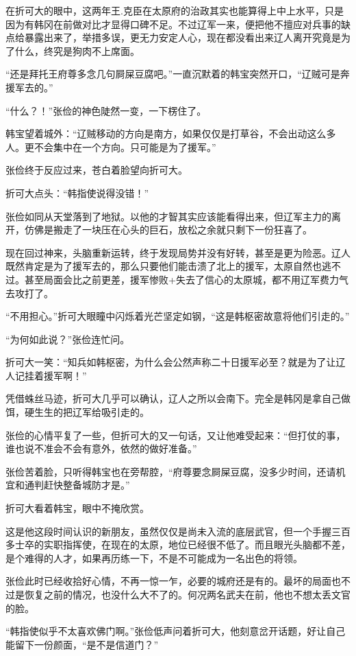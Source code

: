 在折可大的眼中，这两年王.克臣在太原府的治政其实也能算得上中上水平，只是因为有韩冈在前做对比才显得口碑不足。不过辽军一来，便把他不擅应对兵事的缺点给暴露出来了，举措多误，更无力安定人心，现在都没看出来辽人离开究竟是为了什么，终究是狗肉不上席面。

“还是拜托王府尊多念几句屙屎豆腐吧。”一直沉默着的韩宝突然开口，“辽贼可是奔援军去的。”

“什么？！”张俭的神色陡然一变，一下楞住了。

韩宝望着城外：“辽贼移动的方向是南方，如果仅仅是打草谷，不会出动这么多人。更不会集中在一个方向。只可能是为了援军。”

张俭终于反应过来，苍白着脸望向折可大。

折可大点头：“韩指使说得没错！”

张俭如同从天堂落到了地狱。以他的才智其实应该能看得出来，但辽军主力的离开，仿佛是搬走了一块压在心头的巨石，放松之余就只剩下一份狂喜了。

现在回过神来，头脑重新运转，终于发现局势并没有好转，甚至是更为险恶。辽人既然肯定是为了援军去的，那么只要他们能击溃了北上的援军，太原自然也逃不过。甚至局面会比之前更差，援军惨败+失去了信心的太原城，都不用辽军费力气去攻打了。

“不用担心。”折可大眼瞳中闪烁着光芒坚定如钢，“这是韩枢密故意将他们引走的。”

“为何如此说？”张俭连忙问。

折可大一笑：“知兵如韩枢密，为什么会公然声称二十日援军必至？就是为了让辽人记挂着援军啊！”

凭借蛛丝马迹，折可大几乎可以确认，辽人之所以会南下。完全是韩冈是拿自己做饵，硬生生的把辽军给吸引走的。

张俭的心情平复了一些，但折可大的又一句话，又让他难受起来：“但打仗的事，谁也说不准会不会有意外，依然的做好准备。”

张俭苦着脸，只听得韩宝也在旁帮腔，“府尊要念屙屎豆腐，没多少时间，还请机宜和通判赶快整备城防才是。”

折可大看着韩宝，眼中不掩欣赏。

这是他这段时间认识的新朋友，虽然仅仅是尚未入流的底层武官，但一个手握三百多士卒的实职指挥使，在现在的太原，地位已经很不低了。而且眼光头脑都不差，是个难得的人才，如果再历练一下，不是不可能成为一名出色的将领。

张俭此时已经收拾好心情，不再一惊一乍，必要的城府还是有的。最坏的局面也不过是恢复之前的情况，也没什么大不了的。何况两名武夫在前，他也不想太丢文官的脸。

“韩指使似乎不太喜欢佛门啊。”张俭低声问着折可大，他刻意岔开话题，好让自己能留下一份颜面，“是不是信道门？”

